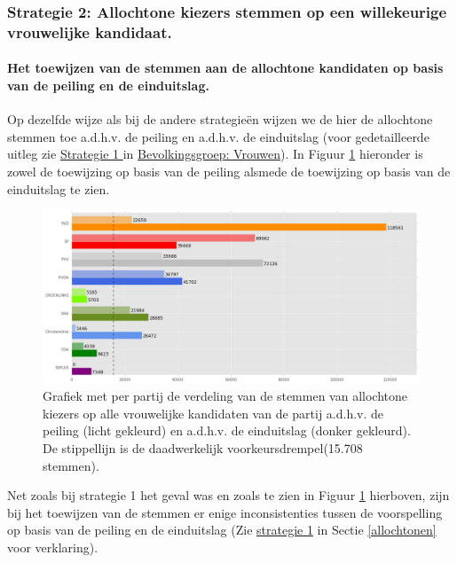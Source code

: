 \subsubsection{Strategie 2: Allochtone kiezers stemmen op een willekeurige vrouwelijke kandidaat.}





\paragraph{Het toewijzen van de stemmen aan de allochtone kandidaten op basis van de peiling en de einduitslag.}
Op dezelfde wijze als bij de andere strategie\"{e}n wijzen we de hier de allochtone stemmen toe a.d.h.v. de peiling en a.d.h.v. de einduitslag (voor gedetailleerde uitleg zie \hyperref[S1V]{Strategie 1 }in \hyperref[vrouwen]{Bevolkingsgroep: Vrouwen}). In Figuur \ref{fig:stemmenS2A} hieronder is zowel de toewijzing op basis van de peiling alsmede de toewijzing op basis van de einduitslag te zien.
 


\begin{figure}[H]

	\includegraphics[width=\linewidth]	{stemmen_op_allochtonen_willekeurig_samen2.png}

			\caption{Grafiek met per partij de verdeling van de stemmen van allochtone kiezers op alle vrouwelijke kandidaten van de partij a.d.h.v. de peiling (licht gekleurd) en a.d.h.v. de einduitslag (donker gekleurd). De stippellijn is de daadwerkelijk voorkeursdrempel(15.708 stemmen).}

\label{fig:stemmenS2A}
\end{figure}

Net zoals bij strategie 1 het geval was en zoals te zien in Figuur \ref{fig:stemmenS2A} hierboven, zijn bij het toewijzen van de stemmen er enige inconsistenties tussen de voorspelling op basis van de peiling en de einduitslag (Zie \hyperref[S1A]{strategie 1} in Sectie \ref{allochtonen} voor verklaring).

